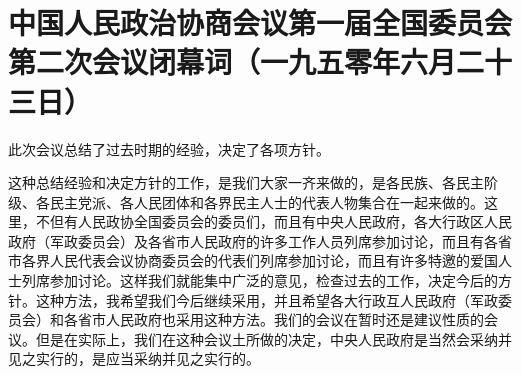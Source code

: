 \section[中国人民政治协商会议第一届全国委员会第二次会议闭幕词（一九五零年六月二十三日）]{中国人民政治协商会议第一届全国委员会第二次会议闭幕词（一九五零年六月二十三日）}


此次会议总结了过去时期的经验，决定了各项方针。

这种总结经验和决定方针的工作，是我们大家一齐来做的，是各民族、各民主阶级、各民主党派、各人民团体和各界民主人士的代表人物集合在一起来做的。这里，不但有人民政协全国委员会的委员们，而且有中央人民政府，各大行政区人民政府（军政委员会）及各省市人民政府的许多工作人员列席参加讨论，而且有各省市各界人民代表会议协商委员会的代表们列席参加讨论，而且有许多特邀的爱国人士列席参加讨论。这样我们就能集中广泛的意见，检查过去的工作，决定今后的方针。这种方法，我希望我们今后继续采用，并且希望各大行政互人民政府（军政委员会）和各省市人民政府也采用这种方法。我们的会议在暂时还是建议性质的会议。但是在实际上，我们在这种会议土所做的决定，中央人民政府是当然会采纳并见之实行的，是应当采纳并见之实行的。

